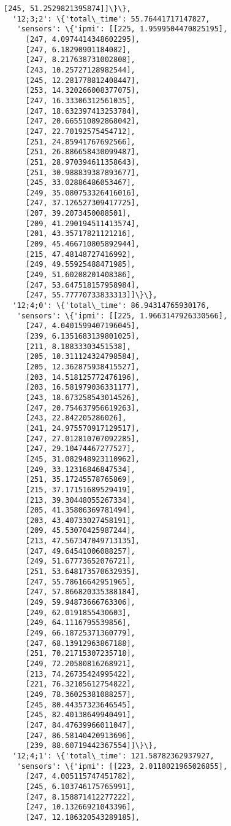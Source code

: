 \documentclass[11pt]{article}
\begin{document}
\begin{tcolorbox}[breakable, size=fbox, boxrule=.5pt, pad at break*=1mm, opacityfill=0]
\begin{Verbatim}[commandchars=\\\{\}]
     [245, 51.2529821395874]]\}\},
  '12;3;2': \{'total\_time': 55.76441717147827,
   'sensors': \{'ipmi': [[225, 1.9599504470825195],
     [247, 4.0974414348602295],
     [247, 6.18290901184082],
     [247, 8.217638731002808],
     [243, 10.25727128982544],
     [245, 12.281778812408447],
     [253, 14.320266008377075],
     [247, 16.33306312561035],
     [247, 18.632397413253784],
     [247, 20.665510892868042],
     [247, 22.70192575454712],
     [251, 24.85941767692566],
     [251, 26.886658430099487],
     [251, 28.970394611358643],
     [251, 30.988839387893677],
     [245, 33.02886486053467],
     [249, 35.080753326416016],
     [247, 37.126527309417725],
     [207, 39.2073450088501],
     [209, 41.290194511413574],
     [201, 43.35717821121216],
     [209, 45.466710805892944],
     [215, 47.48148727416992],
     [249, 49.55925488471985],
     [249, 51.60208201408386],
     [247, 53.647518157958984],
     [247, 55.77770733833313]]\}\},
  '12;4;0': \{'total\_time': 86.94314765930176,
   'sensors': \{'ipmi': [[225, 1.9663147926330566],
     [247, 4.0401599407196045],
     [239, 6.1351683139801025],
     [211, 8.18833303451538],
     [205, 10.311124324798584],
     [205, 12.362875938415527],
     [203, 14.518125772476196],
     [203, 16.581979036331177],
     [243, 18.673258543014526],
     [247, 20.754637956619263],
     [243, 22.842205286026],
     [241, 24.975570917129517],
     [247, 27.012810707092285],
     [247, 29.10474467277527],
     [245, 31.082948923110962],
     [249, 33.12316846847534],
     [251, 35.17245578765869],
     [215, 37.17151689529419],
     [213, 39.30448055267334],
     [205, 41.35806369781494],
     [203, 43.40733027458191],
     [209, 45.53070425987244],
     [213, 47.567347049713135],
     [247, 49.64541006088257],
     [249, 51.67773652076721],
     [251, 53.648173570632935],
     [247, 55.78616642951965],
     [247, 57.866820335388184],
     [249, 59.94873666763306],
     [249, 62.0191855430603],
     [249, 64.1116795539856],
     [249, 66.18725371360779],
     [247, 68.13912963867188],
     [251, 70.21715307235718],
     [249, 72.20580816268921],
     [213, 74.26735424995422],
     [221, 76.32105612754822],
     [249, 78.36025381088257],
     [245, 80.44357323646545],
     [245, 82.40138649940491],
     [247, 84.47639966011047],
     [247, 86.58140420913696],
     [239, 88.60719442367554]]\}\},
  '12;4;1': \{'total\_time': 121.58782362937927,
   'sensors': \{'ipmi': [[223, 2.0118021965026855],
     [247, 4.005115747451782],
     [245, 6.103746175765991],
     [247, 8.158871412277222],
     [247, 10.13266921043396],
     [247, 12.186320543289185],

\end{Verbatim}
\end{tcolorbox}
\end{document}
